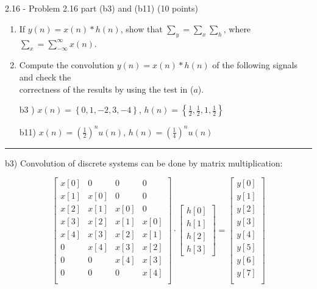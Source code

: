 \documentclass[a4paper, 11pt]{exam}
\begin{document}
\section{} 
2.16 - Problem 2.16 part (b3) and (b11) (10 points)
\newline
\begin{enumerate}
\item If $y(n) = x(n) \ast h(n)$, show that $\sum_y = \sum_x\sum_h$, where $\sum_x = \sum_{-\infty}^{\infty}x(n)$.
\item Compute the convolution $y(n) = x(n) \ast h(n)$ of the following signals and check the \\ correctness of the results by using the test in ($a$).
\end{enumerate}

\begin{enumerate}
  \item  [b3   )] $x(n) = \left\lbrace0, 1, -2, 3, -4\right\rbrace$, $ h(n) = \left\lbrace \frac{1}{2} , \frac{1}{2} , 1, \frac{1}{2} \right\rbrace$
  \item  [b11)] $x(n) =\left(\frac{1}{2}\right)^n u(n)$, $ h(n) =\left( \frac{1}{4}\right)^n u(n)$
\end{enumerate}
\hrule
\vspace{1em}
b3) Convolution of discrete systems can be done by matrix multiplication:
\begin{center}
\[
\begin{bmatrix}
x[0]&0&0&0\\
x[1]&x[0]&0&0\\
x[2]&x[1]&x[0]&0\\
x[3]&x[2]&x[1]&x[0]\\
x[4]&x[3]&x[2]&x[1]\\
0&x[4]&x[3]&x[2]\\
0&0&x[4]&x[3]\\
0&0&0&x[4]\\

\end{bmatrix} 
\cdot
\begin{bmatrix}
h[0]\\
h[1]\\
h[2]\\
h[3]
\end{bmatrix}
=
\begin{bmatrix}
y[0]\\
y[1]\\
y[2]\\
y[3]\\
y[4]\\
y[5]\\
y[6]\\
y[7]\\
\end{bmatrix}
\]
\end{center}
\end{document}

